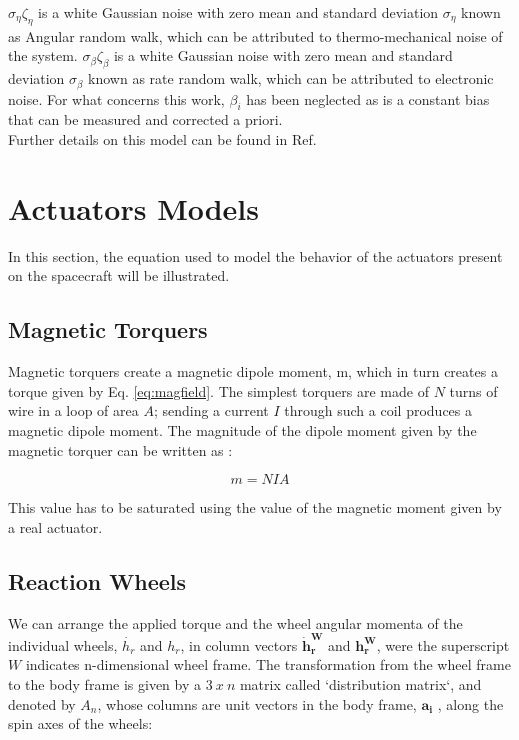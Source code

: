 \documentclass[11pt,a4paper]{report}
\begin{document}
$\sigma_{\eta} \zeta_{\eta}$ is a white Gaussian noise with zero mean and standard deviation $\sigma_{\eta}$ known as Angular random walk, which can be attributed to thermo-mechanical noise of the system.
$\sigma_{\beta} \zeta_{\beta}$ is a white Gaussian noise with zero mean and standard deviation $\sigma_{\beta}$ known as rate random walk, which can be attributed to electronic noise.
For what concerns this work, $\beta_{i}$ has been neglected as is a constant bias that can be measured and corrected a priori.\\
Further details on this model can be found in Ref. \cite{Ref:Books:wertz}

\section{Actuators Models}
In this section, the equation used to model the behavior of the actuators present on the spacecraft will be illustrated.

\subsection{Magnetic Torquers}
Magnetic torquers create a magnetic dipole moment, m, which in turn creates a torque given by Eq. \ref{eq:magfield}. 
The simplest torquers are made of $N$ turns of wire in a loop of area $A$; sending a current $I$ through such a coil produces a magnetic dipole moment.
The magnitude of the dipole moment given by the magnetic torquer can be written as :

\begin{equation}
 m = NIA
\end{equation}

This value has to be saturated using the value of the magnetic moment given by a real actuator.

\subsection{Reaction Wheels}
We can arrange the applied torque and the wheel angular momenta of the individual wheels, $\dot{h_{r}}$ and $h_{r}$, in column vectors $\mathbf{\dot{h}_{r}^W}$ and $\mathbf{{h_{r}^W}}$, were the superscript $W$ indicates n-dimensional wheel frame. The transformation from the wheel frame to the body frame is given by a $3 \ x \ n$ matrix called `distribution matrix`, and denoted by $\mathit{A_{n}}$, whose columns are unit vectors in the body frame, $\mathbf{a_{i}}$ , along the spin axes of the wheels:
\end{document}
